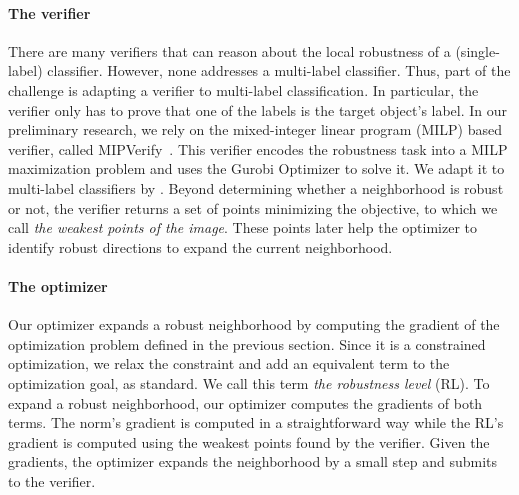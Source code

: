 \paragraph{The verifier}
There are many verifiers that can reason about the local robustness of a (single-label) classifier. However, none addresses a multi-label classifier. Thus, part of the challenge is adapting a verifier to multi-label classification. 
In particular, the verifier only has to prove that one of the labels is the target object's label. %
    In our preliminary research, we rely on the mixed-integer linear program (MILP) based verifier, called MIPVerify~\cite{MIPVERIFY}. This verifier encodes the robustness task into a MILP maximization problem and uses the Gurobi Optimizer to solve it.
    We adapt it to multi-label classifiers by .
    Beyond determining whether a neighborhood is robust or not, the verifier returns a set of points minimizing the objective, to which we call \emph{the weakest points of the image}. These points later help the optimizer to identify robust directions to expand the current neighborhood.
    
    \paragraph{The optimizer}
    Our optimizer expands a robust neighborhood by computing the gradient of the optimization problem defined in the previous section.
    Since it is a constrained optimization, we relax the constraint and add an equivalent term to the optimization goal, as standard.
    We call this term \emph{the robustness level} (RL).
    To expand a robust neighborhood, our optimizer 
    computes the gradients of both terms.
    The norm's gradient is computed in a straightforward way while the RL's gradient is computed using the weakest points found by the verifier.
    Given the gradients, the optimizer expands the neighborhood by a small step and submits to the verifier. 
    

